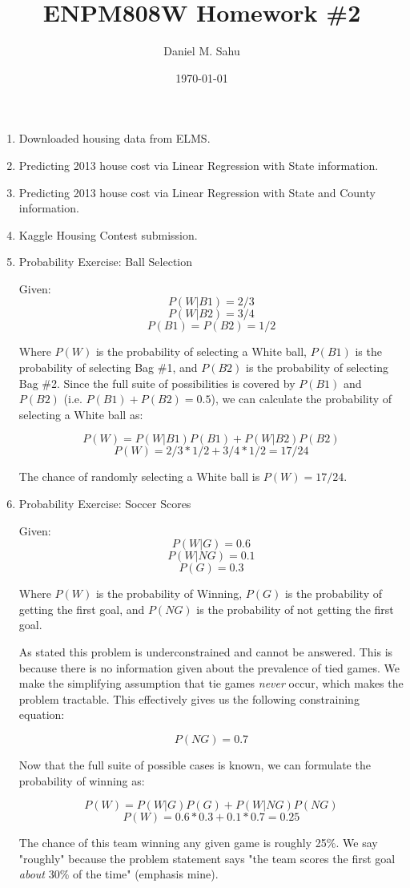 \documentclass[12pt]{article}
\title{ENPM808W Homework \#2}
\author{Daniel M. Sahu}
\date{\today}
\begin{document}
\maketitle
\begin{enumerate}[leftmargin=\labelsep]
\item Downloaded housing data from ELMS.
\item Predicting 2013 house cost via Linear Regression with State information.
\item Predicting 2013 house cost via Linear Regression with State and County information.
\item Kaggle Housing Contest submission.
\item Probability Exercise: Ball Selection

  Given:
    \[ P(W | B1) = 2/3 \]
    \[ P(W | B2) = 3/4 \]
    \[ P(B1) = P(B2) = 1/2 \]

  Where \(P(W)\) is the probability of selecting a White ball, \(P(B1)\) is the probability of selecting Bag \#1, and \(P(B2)\) is the probability of selecting Bag \#2.
  Since the full suite of possibilities is covered by \(P(B1)\) and \(P(B2)\) (i.e. \( P(B1) + P(B2) = 0.5 \)), we can calculate the probability of selecting a White ball as:

    \[ P(W) = P(W | B1) P(B1) + P(W | B2) P(B2) \]
    \[ P(W) = 2/3 * 1/2 + 3/4 * 1/2 = 17/24 \]

  The chance of randomly selecting a White ball is \(P(W) = 17/24\).

\item Probability Exercise: Soccer Scores

  Given:
    \[ P(W | G) = 0.6 \]
    \[ P(W | NG) = 0.1 \]
    \[ P(G) = 0.3 \]

  Where \(P(W)\) is the probability of Winning, \(P(G)\) is the probability of getting the first goal, and \(P(NG)\) is the probability of not getting the first goal.
  
  As stated this problem is underconstrained and cannot be answered. This is because there is no information given about the prevalence of tied games. We make the simplifying assumption that tie games \emph{never} occur, which makes the problem tractable. This effectively gives us the following constraining equation:

    \[ P(NG) = 0.7 \]

  Now that the full suite of possible cases is known, we can formulate the probability of winning as:

    \[ P(W) = P(W | G) P(G) + P(W | NG) P(NG) \]
    \[ P(W) = 0.6 * 0.3 + 0.1 * 0.7 = 0.25 \]

    The chance of this team winning any given game is roughly 25\%. We say "roughly" because the problem statement says "the team scores the first goal \emph{about} 30\% of the time" (emphasis mine).

\end{enumerate}
\end{document}
